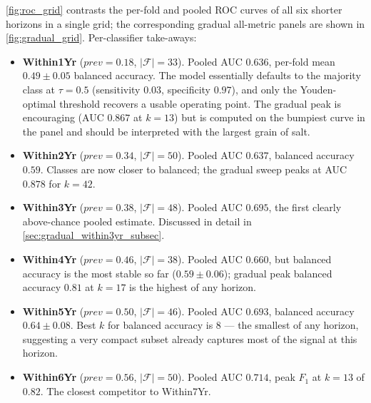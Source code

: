 \documentclass[11pt,a4paper]{article}
\providecommand{\Cref}[1]{\autoref{#1}}
\begin{document}
\Cref{fig:roc_grid} contrasts the per-fold and pooled ROC curves of all
six shorter horizons in a single grid; the corresponding gradual
all-metric panels are shown in \Cref{fig:gradual_grid}. Per-classifier
take-aways:
\begin{itemize}[leftmargin=*]
  \item \textbf{Within1Yr} ($\mathit{prev}\!=\!0.18$, $|\mathcal{F}|=33$).
    Pooled AUC $0.636$, per-fold mean $0.49\pm 0.05$ balanced accuracy.
    The model essentially defaults to the majority class at $\tau=0.5$
    (sensitivity $0.03$, specificity $0.97$), and only the
    Youden-optimal threshold recovers a usable operating point. The
    gradual peak is encouraging (AUC $0.867$ at $k=13$) but is computed
    on the bumpiest curve in the panel and should be interpreted with
    the largest grain of salt.
  \item \textbf{Within2Yr} ($\mathit{prev}\!=\!0.34$, $|\mathcal{F}|=50$).
    Pooled AUC $0.637$, balanced accuracy $0.59$. Classes are now closer
    to balanced; the gradual sweep peaks at AUC $0.878$ for $k=42$.
  \item \textbf{Within3Yr} ($\mathit{prev}\!=\!0.38$, $|\mathcal{F}|=48$).
    Pooled AUC $0.695$, the first clearly above-chance pooled estimate.
    Discussed in detail in \Cref{sec:gradual_within3yr_subsec}.
  \item \textbf{Within4Yr} ($\mathit{prev}\!=\!0.46$, $|\mathcal{F}|=38$).
    Pooled AUC $0.660$, but balanced accuracy is the most stable so far
    ($0.59\pm 0.06$); gradual peak balanced accuracy $0.81$ at $k=17$
    is the highest of any horizon.
  \item \textbf{Within5Yr} ($\mathit{prev}\!=\!0.50$, $|\mathcal{F}|=46$).
    Pooled AUC $0.693$, balanced accuracy $0.64\pm 0.08$. Best $k$ for
    balanced accuracy is $8$ --- the smallest of any horizon, suggesting
    a very compact subset already captures most of the signal at this
    horizon.
  \item \textbf{Within6Yr} ($\mathit{prev}\!=\!0.56$, $|\mathcal{F}|=50$).
    Pooled AUC $0.714$, peak $F_1$ at $k=13$ of $0.82$. The closest
    competitor to Within7Yr.
\end{itemize}
\end{document}

